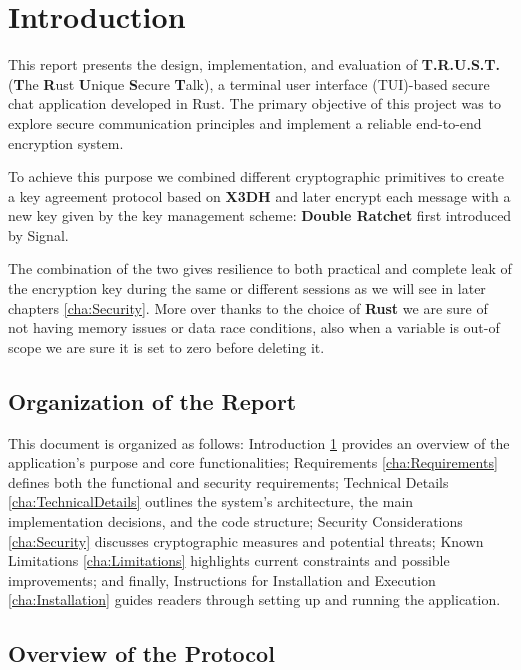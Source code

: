 \chapter{Introduction}
\label{cha:Inroduction}

This report presents the design, implementation, and evaluation of \textbf{T.R.U.S.T.} (\textbf{T}he \textbf{R}ust \textbf{U}nique \textbf{S}ecure \textbf{T}alk), a terminal user interface (TUI)-based secure chat application developed in Rust. The primary objective of this project was to explore secure communication principles and implement a reliable end-to-end encryption system.

To achieve this purpose we combined different cryptographic primitives to create a key agreement protocol based on \textbf{X3DH} \cite{x3dh} and later encrypt each message with a new key given by the key management scheme: \textbf{Double Ratchet} \cite{DoubleRachet} first introduced by Signal.

The combination of the two gives resilience to both practical and complete leak of the encryption key during the same or different sessions as we will see in later chapters \ref{cha:Security}. More over thanks to the choice of \textbf{Rust} we are sure of not having memory issues or data race conditions, also when a variable is out-of scope we are sure it is set to zero before deleting it.

\section{Organization of the Report}
\label{sec:OrganizationReport}

This document is organized as follows: Introduction \ref{cha:Inroduction} provides an overview of the application’s purpose and core functionalities; Requirements \ref{cha:Requirements} defines both the functional and security requirements; Technical Details \ref{cha:TechnicalDetails} outlines the system’s architecture, the main implementation decisions, and the code structure; Security Considerations \ref{cha:Security} discusses cryptographic measures and potential threats; Known Limitations \ref{cha:Limitations} highlights current constraints and possible improvements; and finally, Instructions for Installation and Execution \ref{cha:Installation} guides readers through setting up and running the application.

\section{Overview of the Protocol}
\label{sec:OverviewProtocol}

